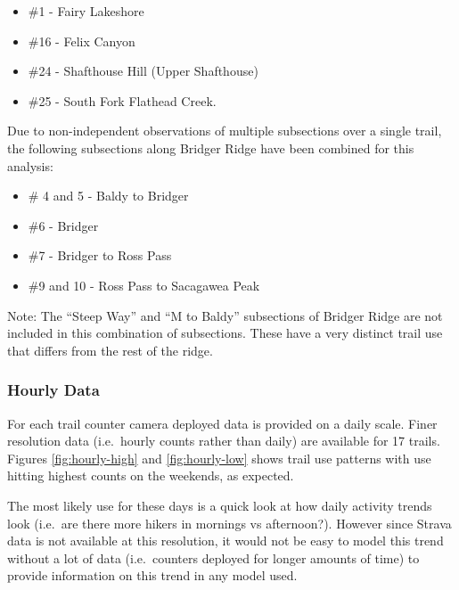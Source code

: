 \documentclass[
]{book}
\providecommand{\tightlist}{%
  \setlength{\itemsep}{0pt}\setlength{\parskip}{0pt}}
\begin{document}
\begin{itemize}
\tightlist
\item
  \#1 - Fairy Lakeshore
\item
  \#16 - Felix Canyon
\item
  \#24 - Shafthouse Hill (Upper Shafthouse)
\item
  \#25 - South Fork Flathead Creek.
\end{itemize}

Due to non-independent observations of multiple subsections over a
single trail, the following subsections along Bridger Ridge have been
combined for this analysis:

\begin{itemize}
\item
  \# 4 and 5 - Baldy to Bridger
\item
  \#6 - Bridger
\item
  \#7 - Bridger to Ross Pass
\item
  \#9 and 10 - Ross Pass to Sacagawea Peak
\end{itemize}

Note: The ``Steep Way'' and ``M to Baldy'' subsections of Bridger Ridge are
not included in this combination of subsections. These have a very
distinct trail use that differs from the rest of the ridge.

\hypertarget{hourly-data}{%
\subsubsection{Hourly Data}\label{hourly-data}}

For each trail counter camera deployed data is provided on a daily
scale. Finer resolution data (i.e.~hourly counts rather than daily) are
available for 17 trails. Figures \ref{fig:hourly-high} and
\ref{fig:hourly-low} shows trail use patterns with use hitting highest
counts on the weekends, as expected.

The most likely use for these days is a quick look at how daily activity
trends look (i.e.~are there more hikers in mornings vs afternoon?).
However since Strava data is not available at this resolution, it would
not be easy to model this trend without a lot of data (i.e.~counters
deployed for longer amounts of time) to provide information on this
trend in any model used.
\end{document}
